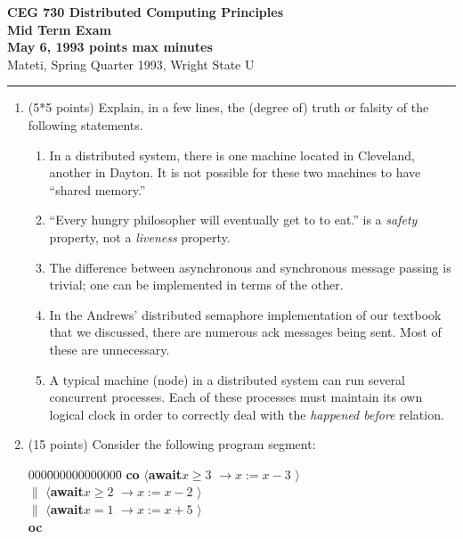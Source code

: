 \def\fat{\framebox[1mm]{\rule{0mm}{2mm}}}
\def\CSP{{\sc csp}}
\def\co{{\bf co}}
\def\oc{{\bf oc}}
\def\pa{{$\parallel$}}
\def\lb{$\langle$}
\def\rb{$\rangle$}
\def\ra{$\rightarrow$}
\def\await{{\bf await}}

\parindent=0pt



{\bf CEG 
\large \bf 730 Distributed Computing Principles\\[5pt]
\large Mid Term Exam\\[10pt]
May 6, 1993  points max  minutes\\
}
\bigskip
{Mateti,  Spring Quarter 1993, Wright State U}\\[-5pt]
\hrule

\begin{enumerate}

\item (5*5 points)
Explain, in a few lines, the (degree of) truth or falsity of the
following statements.

\begin{enumerate}
\item
In a distributed system, there is one machine located in Cleveland,
another in Dayton.  It is not possible for these two machines to have
``shared memory.''

\item
``Every hungry philosopher will eventually get to to eat.'' is a {\sl
safety} property, not a {\sl liveness} property.

\item
The difference between asynchronous and synchronous message passing is
trivial; one can be implemented in terms of the other.


\item
In the Andrews' distributed semaphore implementation of our textbook
that we discussed, there are numerous {\sc ack} messages being sent.
Most of these are unnecessary.

\item
A typical machine (node) in a distributed system can run several
concurrent processes.  Each of these processes must maintain its own
logical clock in order to correctly deal with the {\sl happened
before} relation.

\end{enumerate}

\item (15 points)
Consider the following program segment:

\begin{tabbing}
000\=000000000000\=\kill
\co\> \lb \await $x \geq 3$ \>\ra $x := x - 3$ \rb\\
\pa\> \lb \await $x \geq 2$ \>\ra $x := x - 2$ \rb\\
\pa\> \lb \await $x = 1$ \>\ra $x := x + 5$ \rb\\
\oc\\
\end{tabbing}


\end{enumerate}
